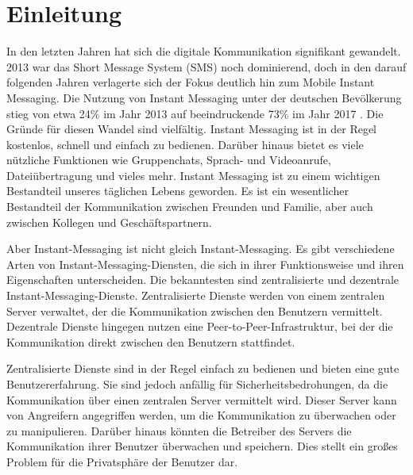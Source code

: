 \chapter{Einleitung}


In den letzten Jahren hat sich die digitale Kommunikation signifikant gewandelt. 2013 war das Short Message System (SMS) noch dominierend, doch in den darauf folgenden Jahren verlagerte sich der Fokus deutlich hin zum Mobile Instant Messaging. Die Nutzung von Instant Messaging unter der deutschen Bevölkerung stieg von etwa 24\% im Jahr 2013 auf beeindruckende 73\% im Jahr 2017 \parencite{Hedda_digiKommunikationVeraendert}. Die Gründe für diesen Wandel sind vielfältig. Instant Messaging ist in der Regel kostenlos, schnell und einfach zu bedienen. Darüber hinaus bietet es viele nützliche Funktionen wie Gruppenchats, Sprach- und Videoanrufe, Dateiübertragung und vieles mehr. Instant Messaging ist zu einem wichtigen Bestandteil unseres täglichen Lebens geworden. Es ist ein wesentlicher Bestandteil der Kommunikation zwischen Freunden und Familie, aber auch zwischen Kollegen und Geschäftspartnern. 

Aber Instant-Messaging ist nicht gleich Instant-Messaging. Es gibt verschiedene Arten von Instant-Messaging-Diensten, die sich in ihrer Funktionsweise und ihren Eigenschaften unterscheiden. Die bekanntesten sind zentralisierte und dezentrale Instant-Messaging-Dienste. Zentralisierte Dienste werden von einem zentralen Server verwaltet, der die Kommunikation zwischen den Benutzern vermittelt. Dezentrale Dienste hingegen nutzen eine Peer-to-Peer-Infrastruktur, bei der die Kommunikation direkt zwischen den Benutzern stattfindet. 

Zentralisierte Dienste sind in der Regel einfach zu bedienen und bieten eine gute Benutzererfahrung. Sie sind jedoch anfällig für Sicherheitsbedrohungen, da die Kommunikation über einen zentralen Server vermittelt wird. Dieser Server kann von Angreifern angegriffen werden, um die Kommunikation zu überwachen oder zu manipulieren. Darüber hinaus könnten die Betreiber des Servers die Kommunikation ihrer Benutzer überwachen und speichern. Dies stellt ein großes Problem für die Privatsphäre der Benutzer dar.

